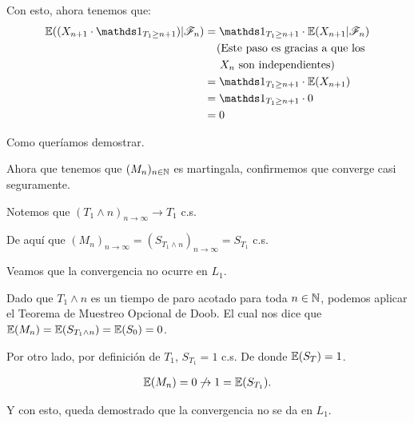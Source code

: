 \begin{itemize}
			Con esto, ahora tenemos que:
			\begin{align}
				\E((X_{n+1} \cdot \indic_{T_1 \geq n+1}) | \F_{n})  &=  \indic_{T_1 \geq n+1} \cdot \E(X_{n+1} | \F_{n})                        \\
                                                                    &\;\;\;\;\mbox{(Este paso es gracias a que los }                            \\
                                                                    &\;\;\;\;\;\mbox{$X_n$ son independientes)}                                 \\
                                                                    &=  \indic_{T_1 \geq n+1} \cdot \E(X_{n+1} )                                \\
                                                                    &=  \indic_{T_1 \geq n+1} \cdot 0                                           \\
                                                                    &=  0
			\end{align}\par\null
			
			Como queríamos demostrar.
	\end{itemize}
	
	Ahora que tenemos que $(M_n)_{n \in \mathbb{N}}$ es martingala, confirmemos que converge casi seguramente.\par\null
	
	Notemos que $(T_1 \wedge n)_{n \rightarrow \infty} \rightarrow T_1$ c.s.\par\null
	
	De aquí que $(M_n)_{n \rightarrow \infty} = (S_{T_1 \wedge n})_{n \rightarrow \infty} = S_{T_1}$ c.s.\par\null				
	
	Veamos que la convergencia no ocurre en $L_1$.\par\null
				
	Dado que $T_1 \wedge n$ es un tiempo de paro acotado para toda $n \in \mathbb{N}$,
	podemos aplicar el Teorema de Muestreo Opcional de 	Doob. 
	El cual nos dice que $\mathbb{E}(M_n) = \mathbb{E}(S_{T_1 \wedge n}) = \mathbb{E}(S_0) = 0$.\par\null
	
	Por otro lado, por definición de $T_1$, $S_{T_1} = 1$ c.s.	De donde $\mathbb{E}(S_T) = 1$.
	
	\begin{align}
		\mathbb{E}(M_n) = 0 \not\rightarrow 1 = \mathbb{E}(S_{T_1}).
	\end{align}\par\null			
	
	Y con esto, queda demostrado que la convergencia no se da en $L_1$.	